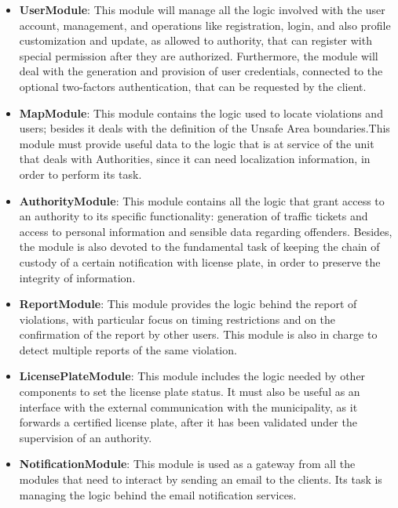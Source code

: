 \begin{itemize}
  \item \textbf{UserModule}: This module will manage all the logic involved with the user account, management, and operations 
  like registration, login, and also profile customization and update, as allowed to authority, that can register 
  with special permission after they are authorized. Furthermore, the module will deal with the generation and provision 
  of user credentials, connected to the optional two-factors authentication, that can be requested by the client.
  \item \textbf{MapModule}: This module contains the logic used to locate violations and users; besides it deals with the 
  definition of the Unsafe Area boundaries.This module must provide useful data to the logic that is at service of the unit 
  that deals with  Authorities, since it can need localization information, in order to perform its task.
  \item \textbf{AuthorityModule}: This module contains all the logic that grant access to an authority to its specific functionality: 
  generation of traffic tickets and access to personal information and sensible data regarding offenders. Besides, 
  the module is also devoted to the fundamental task of keeping the chain of custody of a certain notification with 
  license plate, in order to preserve the integrity of information.
  \item \textbf{ReportModule}: This module provides the logic behind the report of violations, with particular 
  focus on timing restrictions and on the confirmation of the report by other users. This module is also in charge 
  to detect multiple reports of the same violation.
  \item \textbf{LicensePlateModule}: This module includes the logic needed by other components to set the license plate 
  status. It must also be useful as an interface with the external communication with the municipality, as it forwards a 
  certified license plate, after it has been validated under the supervision of an authority.
  \item \textbf{NotificationModule}: This module is used as a gateway from all the modules that need to interact by 
  sending an email to the clients. Its task is managing the logic behind the email notification services.
\end{itemize}


